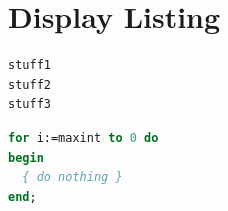 \documentclass{article}
\begin{document}
\section{Display Listing}
\begin{lstlisting}
stuff1
stuff2
stuff3
\end{lstlisting}
\begin{lstlisting}[language=Pascal]
for i:=maxint to 0 do
begin
  { do nothing }
end;
\end{lstlisting}
\end{document}
